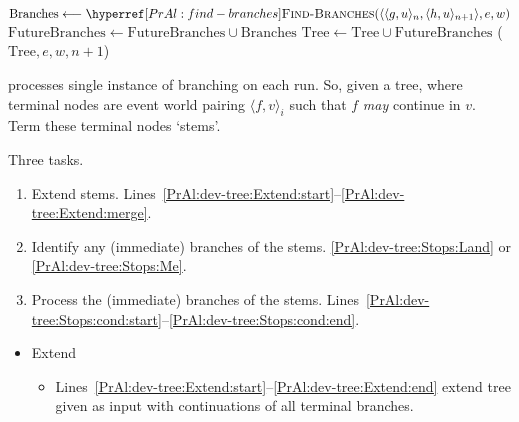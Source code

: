\begin{note}
\begin{algorithm}[H]
{{        \label{PrAl:dev-tree:Stops:cond:else:futureB:start}
        {
          \label{PrAl:dev-tree:Stops:cond:else:futureB:loop:start}
          \(\text{Branches} \longleftarrow \AlgFindBranches{}(\langle \langle g,u \rangle_{n}, \langle h,u \rangle_{n+1}\rangle, e, w)\)\;
          \label{PrAl:dev-tree:Stops:cond:else:futureB:loop:getBranches}
          \(\text{FutureBranches} \longleftarrow \text{FutureBranches} \cup \text{Branches}\)\;
          \label{PrAl:dev-tree:Stops:cond:else:futureB:loop:gather}
        }
        \label{PrAl:dev-tree:Stops:cond:else:futureB:end}
        {
          \(\text{Tree} \longleftarrow \text{Tree} \cup \text{FutureBranches}\)\;
          \label{PrAl:dev-tree:Stops:cond:else:futureB:process:expand}
          \AlgDevelopTree{}(\(\text{Tree}, e,w, n+1\))\;
          \label{PrAl:dev-tree:Stops:cond:else:futureB:process:end}
        }
        \label{PrAl:dev-tree:Stops:cond:else:end}
      }
      \label{PrAl:dev-tree:Stops:cond:end}
    }
  \end{algorithm}

  \AlgDevelopTree{} processes single instance of branching on each run.
  So, given a tree, where terminal nodes are event world pairing \(\langle f,v \rangle_{i}\) such that \(f\) \emph{may} continue in \(v\).
  Term these terminal nodes `stems'.

  Three tasks.
  \begin{enumerate}
  \item
    Extend stems.%
    \hfill%
    Lines~\ref{PrAl:dev-tree:Extend:start}--\ref{PrAl:dev-tree:Extend:merge}.
  \item
    Identify any (immediate) branches of the stems.%
    \hfill%
    \autoref{PrAl:dev-tree:Stops:Land} or \autoref{PrAl:dev-tree:Stops:Me}.
  \item
    Process the (immediate) branches of the stems.%
    \hfill%
    Lines~\ref{PrAl:dev-tree:Stops:cond:start}--\ref{PrAl:dev-tree:Stops:cond:end}.
  \end{enumerate}

  \begin{itemize}
  \item
    Extend
    \begin{itemize}
    \item
      Lines~\ref{PrAl:dev-tree:Extend:start}--\ref{PrAl:dev-tree:Extend:end} extend tree given as input with continuations of all terminal branches.
      

\end{itemize}
\end{itemize}
\end{note}
